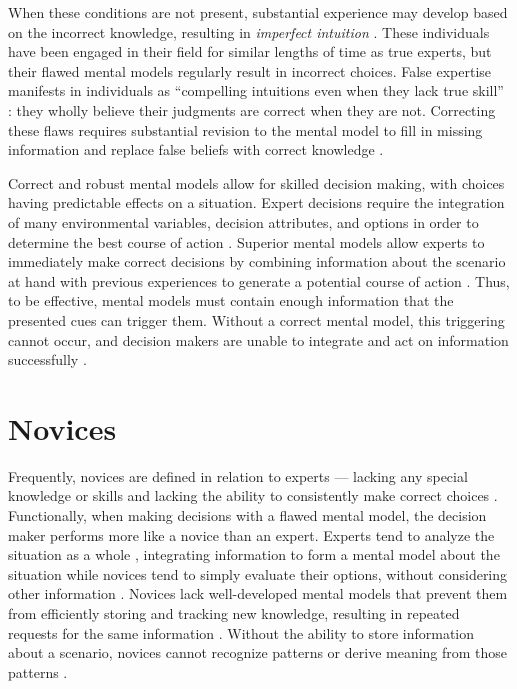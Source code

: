 When these conditions are not present, substantial experience may develop based on the incorrect knowledge, resulting in \emph{imperfect intuition} \citep{Kahneman2009}. These individuals have been engaged in their field for similar lengths of time as true experts, but their flawed mental models regularly result in incorrect choices. False expertise manifests in individuals as ``compelling intuitions even when they lack true skill'' \citep{Kahneman2009}: they wholly believe their judgments are correct when they are not. Correcting these flaws requires substantial revision to the mental model to fill in missing information and replace false beliefs with correct knowledge \citep{Klein2006, Chi2008}.

Correct and robust mental models allow for skilled decision making, with choices having predictable effects on a situation. Expert decisions require the integration of many environmental variables, decision attributes, and options in order to determine the best course of action \citep{Klein2008}. Superior mental models allow experts to immediately make correct decisions \citep{Klein1992} by combining information about the scenario at hand with previous experiences to generate a potential course of action \citep{Klein1999}. Thus, to be effective, mental models must contain enough information that the presented cues can trigger them. Without a correct mental model, this triggering cannot occur, and decision makers are unable to integrate and act on information successfully \citep{Lipshitz1997}.

\section{Novices}

Frequently, novices are defined in relation to experts --- lacking any special knowledge or skills and lacking the ability to consistently make correct choices \citep{Lipshitz1997}. Functionally, when making decisions with a flawed mental model, the decision maker performs more like a novice than an expert. Experts tend to analyze the situation as a whole \citep{Calderwood1990}, integrating information to form a mental model about the situation \citep{Gott1986} while novices tend to simply evaluate their options, without considering other information \citep{Calderwood1990}. Novices lack well-developed mental models that prevent them from efficiently storing and tracking new knowledge, resulting in repeated requests for the same information \citep{Lipshitz1997}. Without the ability to store information about a scenario, novices cannot recognize patterns \citep{Shanteau1988} or derive meaning from those patterns \citep{Means1993}.

